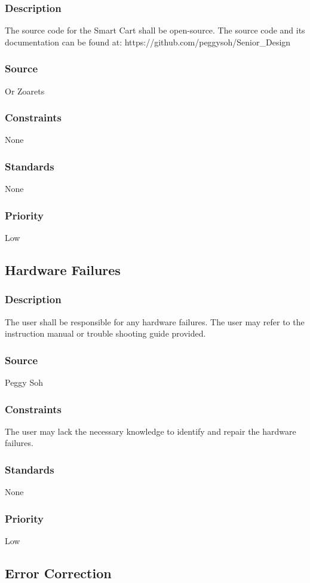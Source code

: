 \subsubsection{Description}
The source code for the Smart Cart shall be open-source. The source code and its documentation can be found at: https://github.com/peggysoh/Senior_Design
\subsubsection{Source}
Or Zoarets
\subsubsection{Constraints}
None
\subsubsection{Standards}
None
\subsubsection{Priority}
Low


\subsection{Hardware Failures}
\subsubsection{Description}
The user shall be responsible for any hardware failures. The user may refer to the instruction manual or trouble shooting guide provided.
\subsubsection{Source}
Peggy Soh
\subsubsection{Constraints}
The user may lack the necessary knowledge to identify and repair the hardware failures.
\subsubsection{Standards}
None
\subsubsection{Priority}
Low


\subsection{Error Correction}
